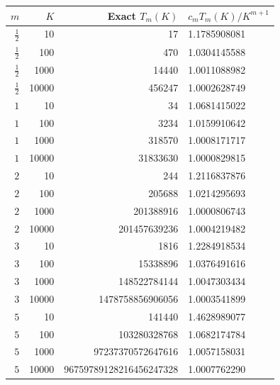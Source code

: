 \begin{tabular}{rrrl}
\toprule
$m$ & $K$ & Exact $T_m(K)$ & $c_mT_m(K)/K^{m+1}$\\
\midrule
$\tfrac12$ & 10 & 17 & 1.1785908081\\
$\tfrac12$ & 100 & 470 & 1.0304145588\\
$\tfrac12$ & 1000 & 14440 & 1.0011088982\\
$\tfrac12$ & 10000 & 456247 & 1.0002628749\\
$1$ & 10 & 34 & 1.0681415022\\
$1$ & 100 & 3234 & 1.0159910642\\
$1$ & 1000 & 318570 & 1.0008171717\\
$1$ & 10000 & 31833630 & 1.0000829815\\
$2$ & 10 & 244 & 1.2116837876\\
$2$ & 100 & 205688 & 1.0214295693\\
$2$ & 1000 & 201388916 & 1.0000806743\\
$2$ & 10000 & 201457639236 & 1.0004219482\\
$3$ & 10 & 1816 & 1.2284918534\\
$3$ & 100 & 15338896 & 1.0376491616\\
$3$ & 1000 & 148522784144 & 1.0047303434\\
$3$ & 10000 & 1478758856906056 & 1.0003541899\\
$5$ & 10 & 141440 & 1.4628989077\\
$5$ & 100 & 103280328768 & 1.0682174784\\
$5$ & 1000 & 97237370572647616 & 1.0057158031\\
$5$ & 10000 & 96759789128216456247328 & 1.0007762290\\
\bottomrule
\end{tabular}
